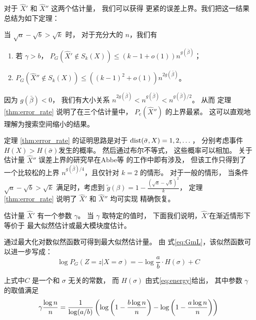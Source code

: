 对于 $\hat{X}'$ 和 $\hat{X}''$ 这两个估计量，
我们可以获得 更紧的误差上界。我们把这一结果总结为如下定理：
\begin{theorem}\label{thm:error_rate}
当 $\sqrt{a} - \sqrt{b} > \sqrt{k}$ 时，
对于充分大的 $n$，我们有 
\begin{enumerate}
	\item 若 $\gamma > b$， $P_G(\hat{X}' \not\in S_k(X)) \leq (k-1+o(1))n^{g(\bar{\beta})}$；
	\item $P_G(\hat{X}'' \not\in S_k(X)) \leq \left((k-1)^2+o(1) \right)n^{2g(\bar{\beta})}$。
\end{enumerate}
\end{theorem}
因为 $g(\bar{\beta})<0$， 我们有大小关系 $n^{2g(\bar{\beta})} < n^{g(\bar{\beta})} < n^{g(\bar{\beta})/2}$。
从而 定理 \ref{thm:error_rate} 说明了在三个估计量中，
$P_e(\hat{X}'')$ 
的上界最紧。
这可以直观地理解为搜索空间缩小的结果。

定理 \ref{thm:error_rate} 的证明思路是对于 $\operatorname{dist}(\bar{\sigma}, X) = 1, 2,\dots$，
分别考虑事件
$H(X) > H(\bar{\sigma})$发生的概率。
然后通过布尔不等式， 这些概率可以相加。
关于估计量 $\hat{X}''$ 误差上界的研究早在Abbe等\cite{abbe2015exact} 的工作中即有涉及，
但该工作只得到了一个比较松的上界 $n^{g(\bar{\beta})/4}$，且仅针对 $k=2$ 的情形。
对于一般的情形，
当条件
$\sqrt{a} - \sqrt{b} > \sqrt{k}$ 满足时，考虑到
$\tilde{g}(\beta) = 1- \frac{\left(\sqrt{a} - \sqrt{b}\right)^2}{k}$，
定理 \ref{thm:error_rate} 说明了  $\hat{X}'$ 和 $\hat{X}''$
均可实现
精确恢复。


估计量 $\hat{X}'$ 有一个参数 $\gamma$。
当 $\gamma$ 取特定的值时， 下面我们说明，$\hat{X}'$在渐近情形下
等价于 最大似然估计或最大模块度估计。

通过最大化对数似然函数可得到最大似然估计量。
由 式\eqref{eq:GmL}，该似然函数可以进一步写成：
\begin{equation}\label{eq:PG_energy}
	\log P_G(Z=z|X=\sigma) = -\log\frac{a}{b} \cdot H(\sigma) + C
\end{equation}

上式中$C$ 是一个和 $\sigma$ 无关的常数，
而 $H(\sigma)$ 由式\eqref{eq:energy}给出，
其中参数 $\gamma$ 的取值满足
\begin{equation}\label{eq:special_gamma_ML}
	\gamma \frac{\log n}{n} = \frac{1}{\log(a/b)}
	\left(\log \left(1-\frac{b \log n}{n} \right) - \log \left(1-\frac{a \log n}{n} \right) \right)	 
\end{equation}

